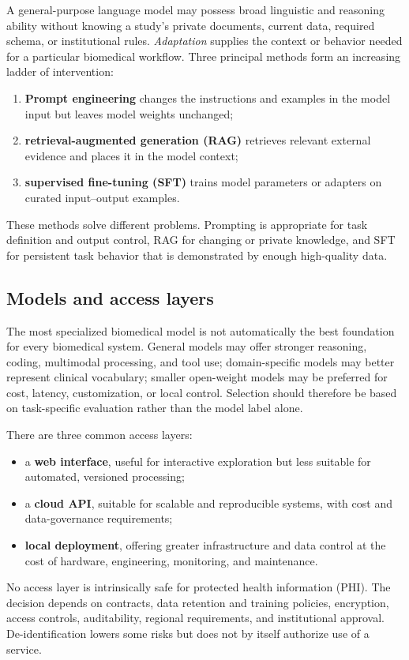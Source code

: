 \documentclass[12pt,oneside]{book}
\numberwithin{equation}{section}
\theoremstyle{definition}
\theoremstyle{plain}
\theoremstyle{remark}
\begin{document}
A general-purpose language model may possess broad linguistic and reasoning
ability without knowing a study's private documents, current data, required
schema, or institutional rules.  \emph{Adaptation} supplies the context or
behavior needed for a particular biomedical workflow.  Three principal methods
form an increasing ladder of intervention:
\begin{enumerate}
    \item \textbf{Prompt engineering} changes the instructions and examples in
    the model input but leaves model weights unchanged;
    \item \textbf{retrieval-augmented generation (RAG)} retrieves relevant
    external evidence and places it in the model context;
    \item \textbf{supervised fine-tuning (SFT)} trains model parameters or
    adapters on curated input--output examples.
\end{enumerate}
These methods solve different problems.  Prompting is appropriate for task
definition and output control, RAG for changing or private knowledge, and SFT
for persistent task behavior that is demonstrated by enough high-quality data.

\subsection{Models and access layers}

The most specialized biomedical model is not automatically the best foundation
for every biomedical system.  General models may offer stronger reasoning,
coding, multimodal processing, and tool use; domain-specific models may better
represent clinical vocabulary; smaller open-weight models may be preferred for
cost, latency, customization, or local control.  Selection should therefore be
based on task-specific evaluation rather than the model label alone.

There are three common access layers:
\begin{itemize}
    \item a \textbf{web interface}, useful for interactive exploration but less
    suitable for automated, versioned processing;
    \item a \textbf{cloud API}, suitable for scalable and reproducible systems,
    with cost and data-governance requirements;
    \item \textbf{local deployment}, offering greater infrastructure and data
    control at the cost of hardware, engineering, monitoring, and maintenance.
\end{itemize}
No access layer is intrinsically safe for protected health information (PHI).
The decision depends on contracts, data retention and training policies,
encryption, access controls, auditability, regional requirements, and
institutional approval.  De-identification lowers some risks but does not by
itself authorize use of a service.
\end{document}
